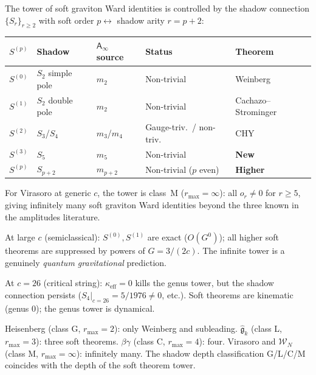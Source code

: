 \documentclass[11pt]{article}
\newcommand{\cW}{\mathcal{W}}
\newcommand{\fg}{\mathfrak{g}}
\newcommand{\Ainf}{\mathsf{A}_{\infty}}
\begin{document}
\begin{theorem}[Soft hierarchy = shadow hierarchy = $\Ainf$ tower;
proved here]
\label{thm:soft-ainf-identification}
The tower of soft graviton Ward identities is controlled by the
shadow connection $\{S_r\}_{r \geq 2}$ with soft order
$p \leftrightarrow$ shadow arity $r = p + 2$:
\begin{center}
\renewcommand{\arraystretch}{1.2}
\begin{tabular}{cllll}
\textbf{$S^{(p)}$} & \textbf{Shadow} &
\textbf{$\Ainf$ source} & \textbf{Status} &
\textbf{Theorem} \\
\hline
$S^{(0)}$ & $S_2$ simple pole & $m_2$ &
  Non-trivial & Weinberg \\[2pt]
$S^{(1)}$ & $S_2$ double pole & $m_2$ &
  Non-trivial & Cachazo--Strominger \\[2pt]
$S^{(2)}$ & $S_3$/$S_4$ & $m_3$/$m_4$ &
  Gauge-triv.\ / non-triv.\ & CHY \\[2pt]
$S^{(3)}$ & $S_5$ & $m_5$ &
  Non-trivial & \textbf{New} \\[2pt]
$S^{(p)}$ & $S_{p+2}$ & $m_{p+2}$ &
  Non-trivial ($p$ even) & \textbf{Higher}
\end{tabular}
\end{center}

\noindent
For Virasoro at generic $c$, the tower is class~M
($r_{\max} = \infty$): all $o_r \ne 0$ for $r \geq 5$,
giving infinitely many soft graviton Ward identities
beyond the three known in the amplitudes literature.

At large $c$ (semiclassical): $S^{(0)}, S^{(1)}$ are exact
($O(G^0)$); all higher soft theorems are suppressed by powers
of $G = 3/(2c)$.  The infinite tower is a genuinely
\emph{quantum gravitational} prediction.

At $c = 26$ (critical string): $\kappa_{\mathrm{eff}} = 0$ kills
the genus tower, but the shadow connection persists
($S_4|_{c=26} = 5/1976 \ne 0$, etc.).  Soft theorems are
kinematic (genus $0$); the genus tower is dynamical.
\end{theorem}

\begin{question}
\label{q:soft-universality}
Heisenberg (class G, $r_{\max} = 2$): only Weinberg and
subleading.  $\hat{\fg}_k$ (class L, $r_{\max} = 3$):
three soft theorems.  $\beta\gamma$ (class C, $r_{\max} = 4$):
four.  Virasoro and $\cW_N$ (class M, $r_{\max} = \infty$):
infinitely many.  The shadow depth classification G/L/C/M
coincides with the depth of the soft theorem tower.
\end{question}
\end{document}
